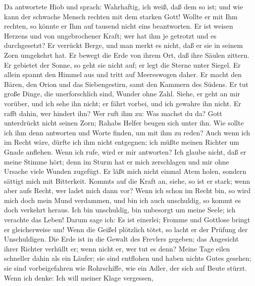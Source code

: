  Da antwortete Hiob und sprach:  Wahrhaftig,
ich weiß, daß dem so ist; und wie kann der schwache Mensch rechten mit
dem starken Gott!  Wollte er mit Ihm rechten, so könnte er
Ihm auf tausend nicht eins beantworten.  Er ist weisen
Herzens und von ungebrochener Kraft; wer hat ihm je getrotzt und es
durchgesetzt?  Er verrückt Berge, und man merkt es nicht,
daß er sie in seinem Zorn umgekehrt hat.  Er bewegt die
Erde von ihrem Ort, daß ihre Säulen zittern.  Er gebietet
der Sonne, so geht sie nicht auf; er legt die Sterne unter Siegel.
 Er allein spannt den Himmel aus und tritt auf Meereswogen
daher.  Er macht den Bären, den Orion und das
Siebengestirn, samt den Kammern des Südens.  Er tut große
Dinge, die unerforschlich sind, Wunder ohne Zahl.  Siehe,
er geht an mir vorüber, und ich sehe ihn nicht; er fährt vorbei, und ich
gewahre ihn nicht.  Er rafft dahin, wer hindert ihn? Wer
ruft ihm zu: Was machst du da?  Gott unterdrückt nicht
seinen Zorn; Rahabs Helfer beugen sich unter ihn.  Wie
sollte ich ihm denn antworten und Worte finden, um mit ihm zu reden?
 Auch wenn ich im Recht wäre, dürfte ich ihm nicht
entgegnen; ich müßte meinen Richter um Gnade anflehen. 
Wenn ich rufe, wird er mir antworten? Ich glaube nicht, daß er meine
Stimme hört;  denn im Sturm hat er mich zerschlagen und
mir ohne Ursache viele Wunden zugefügt.  Er läßt mich
nicht einmal Atem holen, sondern sättigt mich mit Bitterkeit.
 Kommt\textquotesingle s auf die Kraft an, siehe, so ist
er stark; wenn aber aufs Recht, wer ladet mich dann vor? 
Wenn ich schon im Recht bin, so wird mich doch mein Mund verdammen, und
bin ich auch unschuldig, so kommt es doch verkehrt heraus.
 Ich bin unschuldig, bin unbesorgt um meine Seele; ich
verachte das Leben!  Darum sage ich: Es ist einerlei;
Fromme und Gottlose bringt er gleicherweise um!  Wenn die
Geißel plötzlich tötet, so lacht er der Prüfung der Unschuldigen.
 Die Erde ist in die Gewalt des Frevlers gegeben; das
Angesicht ihrer Richter verhüllt er; wenn nicht er, wer tut es denn?
 Meine Tage eilen schneller dahin als ein Läufer; sie
sind entflohen und haben nichts Gutes gesehen;  sie sind
vorbeigefahren wie Rohrschiffe, wie ein Adler, der sich auf Beute
stürzt.  Wenn ich denke: Ich will meiner Klage vergessen,
